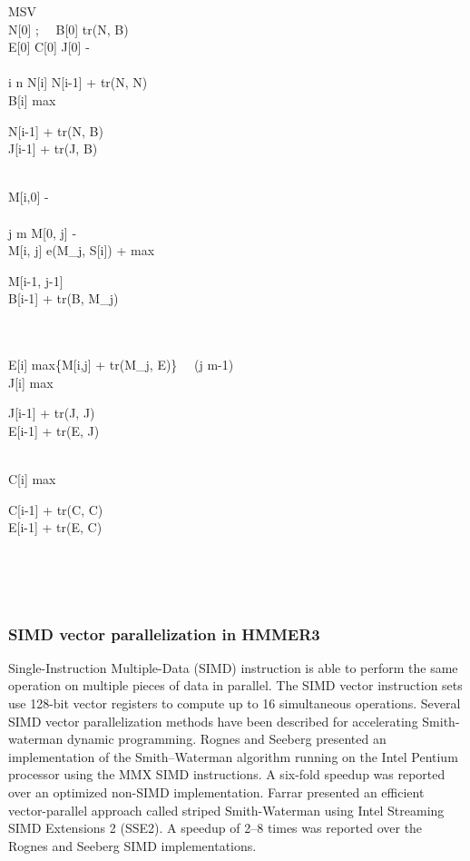 \begin{pseudocode}{MSV}{ }
\label{MSV}
\\
N[0] ; \ \  B[0] \GETS tr(N, B)\\
E[0] \GETS C[0] \GETS J[0] \GETS -\infty\\
\\
\FOR i  \TO n \DO
\BEGIN
  N[i] \GETS N[i-1] + tr(N, N)\\
  B[i] \GETS max 
  \begin{cases}
   N[i-1] + tr(N, B)\\
   J[i-1] + tr(J, B)
  \end{cases}\\
  M[i,0] \GETS -\infty\\
  \\
  \FOR j  \TO m \DO
  \BEGIN
    M[0, j] \GETS -\infty\\
    M[i, j] \GETS e(M_j, S[i]) + max 
    \begin{cases}
     M[i-1, j-1]\\
     B[i-1] + tr(B, M_j)
    \end{cases}\\
  \END\\
  E[i] \GETS max\{M[i,j] + tr(M_j, E)\} \ \  (j  \TO m-1)\\
  J[i] \GETS max 
  \begin{cases}
   J[i-1] + tr(J, J)\\
   E[i-1] + tr(E, J)
  \end{cases}\\
  C[i] \GETS max
  \begin{cases}
   C[i-1] + tr(C, C)\\
   E[i-1] + tr(E, C)
  \end{cases}\\
\END\\
\\
\end{pseudocode}

\subsubsection*{SIMD vector parallelization in HMMER3}
\label{SSE2}

Single-Instruction Multiple-Data (SIMD) instruction is able to perform the same operation on multiple pieces of data in parallel. The SIMD vector instruction sets use 128-bit vector registers to compute up to 16 simultaneous operations. Several SIMD vector parallelization methods have been described for accelerating Smith-waterman dynamic programming. Rognes and Seeberg \citep{SW-SIMD} presented an implementation of the Smith–Waterman algorithm running on the Intel Pentium processor using the MMX SIMD instructions. A six-fold speedup was reported over an optimized non-SIMD implementation. Farrar \citep{SW-SSE2} presented an efficient vector-parallel approach called striped Smith-Waterman using Intel Streaming SIMD Extensions 2 (SSE2). A speedup of 2–8 times was reported over the Rognes and Seeberg SIMD implementations.

